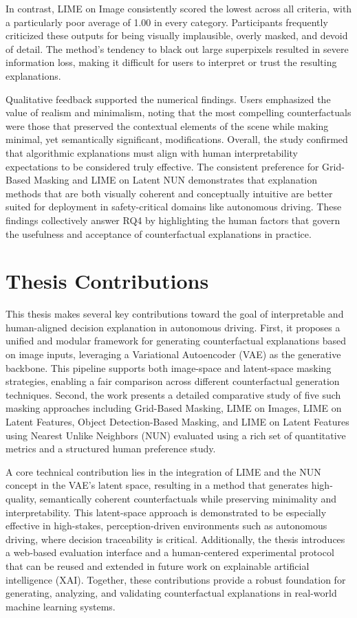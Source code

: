 In contrast, LIME on Image consistently scored the lowest across all criteria, with a particularly poor average of 1.00 in every category. Participants frequently criticized these outputs for being visually implausible, overly masked, and devoid of detail. The method’s tendency to black out large superpixels resulted in severe information loss, making it difficult for users to interpret or trust the resulting explanations.

Qualitative feedback supported the numerical findings. Users emphasized the value of realism and minimalism, noting that the most compelling counterfactuals were those that preserved the contextual elements of the scene while making minimal, yet semantically significant, modifications. Overall, the study confirmed that algorithmic explanations must align with human interpretability expectations to be considered truly effective. The consistent preference for Grid-Based Masking and LIME on Latent NUN demonstrates that explanation methods that are both visually coherent and conceptually intuitive are better suited for deployment in safety-critical domains like autonomous driving. These findings collectively answer RQ4 by highlighting the human factors that govern the usefulness and acceptance of counterfactual explanations in practice.

\section{Thesis Contributions}

This thesis makes several key contributions toward the goal of interpretable and human-aligned decision explanation in autonomous driving. First, it proposes a unified and modular framework for generating counterfactual explanations based on image inputs, leveraging a Variational Autoencoder (VAE) as the generative backbone. This pipeline supports both image-space and latent-space masking strategies, enabling a fair comparison across different counterfactual generation techniques. Second, the work presents a detailed comparative study of five such masking approaches including Grid-Based Masking, LIME on Images, LIME on Latent Features, Object Detection-Based Masking, and LIME on Latent Features using Nearest Unlike Neighbors (NUN) evaluated using a rich set of quantitative metrics and a structured human preference study.

A core technical contribution lies in the integration of LIME and the NUN concept in the VAE’s latent space, resulting in a method that generates high-quality, semantically coherent counterfactuals while preserving minimality and interpretability. This latent-space approach is demonstrated to be especially effective in high-stakes, perception-driven environments such as autonomous driving, where decision traceability is critical. Additionally, the thesis introduces a web-based evaluation interface and a human-centered experimental protocol that can be reused and extended in future work on explainable artificial intelligence (XAI). Together, these contributions provide a robust foundation for generating, analyzing, and validating counterfactual explanations in real-world machine learning systems.


